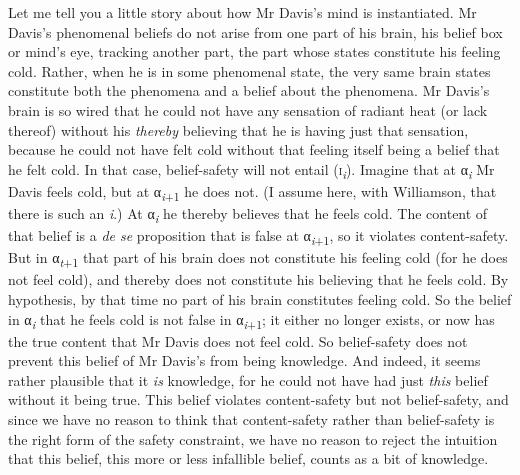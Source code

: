 \documentclass[
  11pt,
  letterpaper,
  DIV=11,
  numbers=noendperiod,
  twoside]{scrartcl}
\begin{document}
Let me tell you a little story about how Mr Davis's mind is
instantiated. Mr Davis's phenomenal beliefs do not arise from one part
of his brain, his belief box or mind's eye, tracking another part, the
part whose states constitute his feeling cold. Rather, when he is in
some phenomenal state, the very same brain states constitute both the
phenomena and a belief about the phenomena. Mr Davis's brain is so wired
that he could not have any sensation of radiant heat (or lack thereof)
without his \emph{thereby} believing that he is having just that
sensation, because he could not have felt cold without that feeling
itself being a belief that he felt cold. In that case, belief-safety
will not entail (\textsc{i}\textsubscript{\emph{i}}). Imagine that at
α\textsubscript{\emph{i}} Mr Davis feels cold, but at
α\textsubscript{\emph{i}+1} he does not. (I assume here, with
Williamson, that there is such an \emph{i}.) At
α\textsubscript{\emph{i}} he thereby believes that he feels cold. The
content of that belief is a \emph{de se} proposition that is false at
α\textsubscript{\emph{i}+1}, so it violates content-safety. But in
α\textsubscript{\emph{t}+1} that part of his brain does not constitute
his feeling cold (for he does not feel cold), and thereby does not
constitute his believing that he feels cold. By hypothesis, by that time
no part of his brain constitutes feeling cold. So the belief in
α\textsubscript{\emph{i}} that he feels cold is not false in
α\textsubscript{\emph{i}+1}; it either no longer exists, or now has the
true content that Mr Davis does not feel cold. So belief-safety does not
prevent this belief of Mr Davis's from being knowledge. And indeed, it
seems rather plausible that it \emph{is} knowledge, for he could not
have had just \emph{this} belief without it being true. This belief
violates content-safety but not belief-safety, and since we have no
reason to think that content-safety rather than belief-safety is the
right form of the safety constraint, we have no reason to reject the
intuition that this belief, this more or less infallible belief, counts
as a bit of knowledge.
\end{document}

